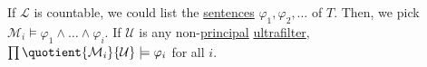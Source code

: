 \begin{intuition}

\end{intuition}

If \(\mathcal{L} \) is countable, we could list the \hyperref[def:sentence]{sentences} \(\varphi _1, \varphi _2, \dots \) of \(T\). Then, we pick \(\mathcal{M} _i \models \varphi _1 \land \dots \land \varphi _i\). If \(\mathcal{U} \) is any non-\hyperref[eg:principal-filter]{principal} \hyperref[def:ultrafilter]{ultrafilter}, \(\prod \quotient{\mathcal{M} _i}{\mathcal{U} } \models \varphi _i\) for all \(i\).